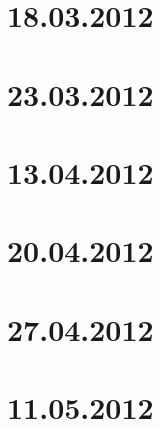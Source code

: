 

\section{18.03.2012}



\section{23.03.2012}



\section{13.04.2012}



\section{20.04.2012}



\section{27.04.2012}



\section{11.05.2012}

